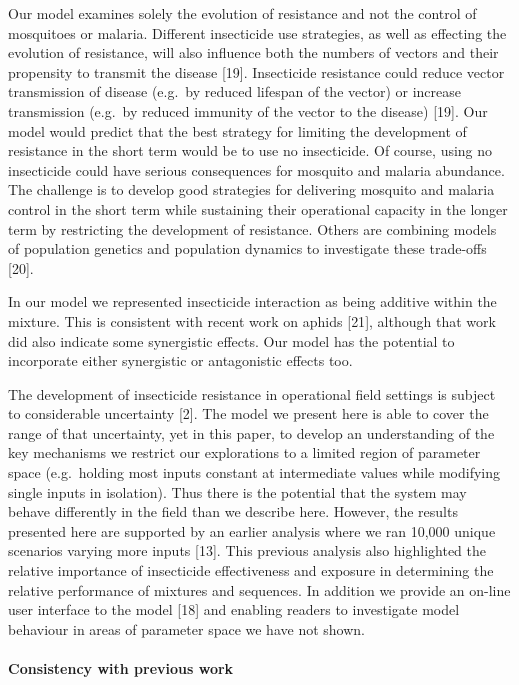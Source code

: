 \documentclass[11pt,]{article}
\let\oldparagraph\paragraph
\renewcommand{\paragraph}[1]{\oldparagraph{#1}\mbox{}}
\begin{document}
Our model examines solely the evolution of resistance and not the
control of mosquitoes or malaria. Different insecticide use strategies,
as well as effecting the evolution of resistance, will also influence
both the numbers of vectors and their propensity to transmit the disease
{[}19{]}. Insecticide resistance could reduce vector transmission of
disease (e.g.~by reduced lifespan of the vector) or increase
transmission (e.g.~by reduced immunity of the vector to the disease)
{[}19{]}. Our model would predict that the best strategy for limiting
the development of resistance in the short term would be to use no
insecticide. Of course, using no insecticide could have serious
consequences for mosquito and malaria abundance. The challenge is to
develop good strategies for delivering mosquito and malaria control in
the short term while sustaining their operational capacity in the longer
term by restricting the development of resistance. Others are combining
models of population genetics and population dynamics to investigate
these trade-offs {[}20{]}.

In our model we represented insecticide interaction as being additive
within the mixture. This is consistent with recent work on aphids
{[}21{]}, although that work did also indicate some synergistic effects.
Our model has the potential to incorporate either synergistic or
antagonistic effects too.

The development of insecticide resistance in operational field settings
is subject to considerable uncertainty {[}2{]}. The model we present
here is able to cover the range of that uncertainty, yet in this paper,
to develop an understanding of the key mechanisms we restrict our
explorations to a limited region of parameter space (e.g.~holding most
inputs constant at intermediate values while modifying single inputs in
isolation). Thus there is the potential that the system may behave
differently in the field than we describe here. However, the results
presented here are supported by an earlier analysis where we ran 10,000
unique scenarios varying more inputs {[}13{]}. This previous analysis
also highlighted the relative importance of insecticide effectiveness
and exposure in determining the relative performance of mixtures and
sequences. In addition we provide an on-line user interface to the model
{[}18{]} and enabling readers to investigate model behaviour in areas of
parameter space we have not shown.

\paragraph{Consistency with previous
work}\label{consistency-with-previous-work}
\end{document}
